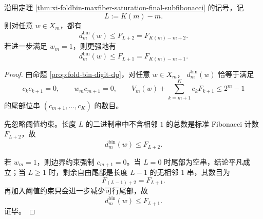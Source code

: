 \begin{theorem}\label{thm:xi-foldbin-universal-fibonacci-upper-bound-lastbit-improvement}
沿用定理 \ref{thm:xi-foldbin-maxfiber-saturation-final-subfibonacci} 的记号，记
\[
L:=K(m)-m.
\]
则对任意 \(w\in X_m\)，都有
\[
\boxed{\;
d_m^{\mathrm{bin}}(w)\le F_{L+2}=F_{K(m)-m+2}.\;}
\]
若进一步满足 \(w_m=1\)，则更强地有
\[
\boxed{\;
d_m^{\mathrm{bin}}(w)\le F_{L+1}=F_{K(m)-m+1}.\;}
\]
\end{theorem}
\begin{proof}
由命题 \ref{prop:fold-bin-digit-dp}，对任意 \(w\in X_m\)，
\(
d_m^{\mathrm{bin}}(w)
\)
恰等于满足
\[
c_kc_{k+1}=0,\qquad
w_mc_{m+1}=0,\qquad
V_m(w)+\sum_{k=m+1}^{K}c_kF_{k+1}\le 2^m-1
\]
的尾部位串 \((c_{m+1},\dots,c_K)\) 的数目。

先忽略阈值约束。长度 \(L\) 的二进制串中不含相邻 \(1\) 的总数是标准 Fibonacci 计数 \(F_{L+2}\)，故
\[
d_m^{\mathrm{bin}}(w)\le F_{L+2}.
\]

若 \(w_m=1\)，则边界约束强制 \(c_{m+1}=0\)。当 \(L=0\) 时尾部为空串，结论平凡成立；当 \(L\ge 1\) 时，剩余自由尾部是长度 \(L-1\) 的无相邻 \(1\) 串，其数目为
\[
F_{(L-1)+2}=F_{L+1}.
\]
再加入阈值约束只会进一步减少可行尾部，故
\[
d_m^{\mathrm{bin}}(w)\le F_{L+1}.
\]
证毕。
\end{proof}

